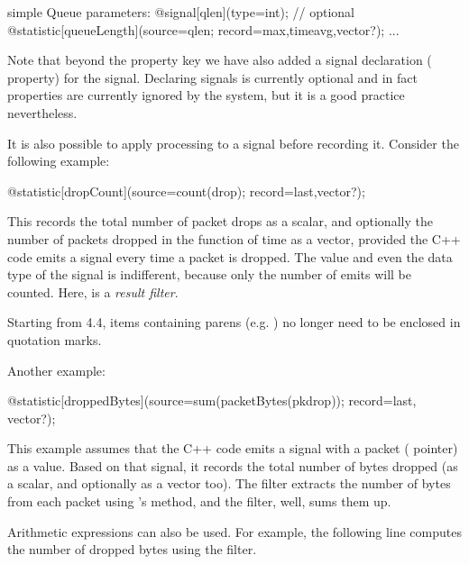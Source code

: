 \begin{ned}
\begin{ned}
simple Queue
{
    parameters:
        @signal[qlen](type=int); // optional
        @statistic[queueLength](source=qlen; record=max,timeavg,vector?);
        ...
}
\end{ned}

Note that beyond the  property key we have also added
a signal declaration ( property) for the  signal.
Declaring signals is currently optional and in fact  properties
are currently ignored by the system, but it is a good practice nevertheless.

It is also possible to apply processing to a signal before recording it.
Consider the following example:

\begin{ned}
@statistic[dropCount](source=count(drop); record=last,vector?);
\end{ned}

This records the total number of packet drops as a scalar, and
optionally the number of packets dropped in the function of time as a
vector, provided the C++ code emits a  signal every time a packet
is dropped. The value and even the data type of the  signal is
indifferent, because only the number of emits will be counted.
Here,  is a \textit{result filter}.

\begin{note}
Starting from {\opp} 4.4, items containing parens (e.g. )
no longer need to be enclosed in quotation marks.
\end{note}

Another example:

\begin{ned}
@statistic[droppedBytes](source=sum(packetBytes(pkdrop)); record=last,
vector?);
\end{ned}

This example assumes that the C++ code emits a  signal with a
packet ( pointer) as a value. Based on that signal, it
records the total number of bytes dropped (as a scalar, and optionally as a
vector too). The  filter extracts the number of bytes
from each packet using 's  method,
and the  filter, well, sums them up.

Arithmetic expressions can also be used. For example, the following line
computes the number of dropped bytes using the  filter.


\end{ned}
